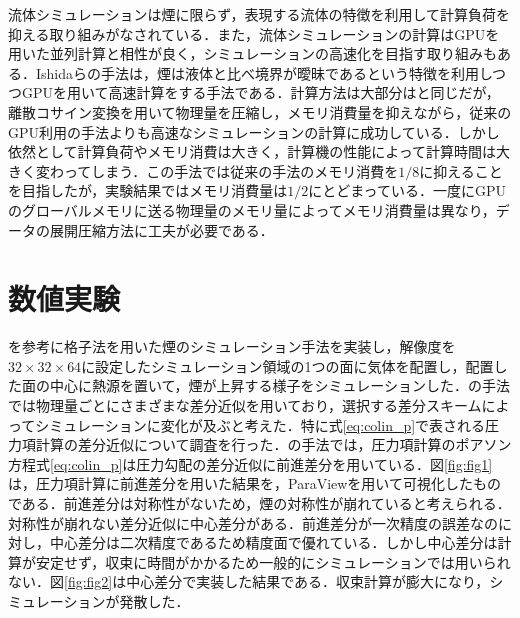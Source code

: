 \documentclass[10pt,a4paper,notitlepage,oneside,twocolumn]{abst_jsarticle}
\begin{document}
流体シミュレーションは煙に限らず，表現する流体の特徴を利用して計算負荷を抑える取り組みがなされている．また，流体シミュレーションの計算はGPUを用いた並列計算と相性が良く，シミュレーションの高速化を目指す取り組みもある．Ishidaらの手法\cite{GPU}は，煙は液体と比べ境界が曖昧であるという特徴を利用しつつGPUを用いて高速計算をする手法である．計算方法は大部分は\cite{fedkiew}と同じだが，離散コサイン変換を用いて物理量を圧縮し，メモリ消費量を抑えながら，従来のGPU利用の手法よりも高速なシミュレーションの計算に成功している．しかし依然として計算負荷やメモリ消費は大きく，計算機の性能によって計算時間は大きく変わってしまう．この手法では従来の手法のメモリ消費を$1/8$に抑えることを目指したが，実験結果ではメモリ消費量は$1/2$にとどまっている．一度にGPUのグローバルメモリに送る物理量のメモリ量によってメモリ消費量は異なり，データの展開圧縮方法に工夫が必要である．

\section{数値実験}
\cite{fedkiew}を参考に格子法を用いた煙のシミュレーション手法を実装し，解像度を$32\times32\times64$に設定したシミュレーション領域の1つの面に気体を配置し，配置した面の中心に熱源を置いて，煙が上昇する様子をシミュレーションした．\cite{fedkiew}の手法では物理量ごとにさまざまな差分近似を用いており，選択する差分スキームによってシミュレーションに変化が及ぶと考えた．特に式\ref{eq:colin_p}で表される圧力項計算の差分近似について調査を行った．\cite{fedkiew}の手法では，圧力項計算のポアソン方程式\ref{eq:colin_p}は圧力勾配の差分近似に前進差分を用いている．図\ref{fig:fig1}は，圧力項計算に前進差分を用いた結果を，ParaViewを用いて可視化したものである．前進差分は対称性がないため，煙の対称性が崩れていると考えられる．対称性が崩れない差分近似に中心差分がある．前進差分が一次精度の誤差なのに対し，中心差分は二次精度であるため精度面で優れている．しかし中心差分は計算が安定せず，収束に時間がかかるため一般的にシミュレーションでは用いられない．図\ref{fig:fig2}は中心差分で実装した結果である．収束計算が膨大になり，シミュレーションが発散した．
\end{document}
